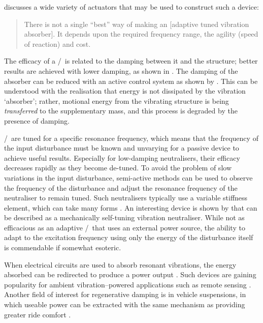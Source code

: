 \textcite{brennan2006} discusses a wide variety of actuators that may
be used to construct such a device:
\begin{quote}
  There is not a single ``best'' way of making an [adaptive tuned
  vibration absorber].
  It depends upon the required frequency range,
  the agility (speed of reaction) and cost.
\end{quote}

The efficacy of a \vibneut/\ is related to the damping between
it and the structure; better results are achieved with lower damping, as shown
in .
The damping of the absorber can be reduced with an
active control system as shown by \textcite{kidner1998}.
This can be
understood with the realisation that energy is not dissipated by the vibration
`absorber'; rather, motional energy from the vibrating structure is being
\emph{transferred} to the supplementary mass, and this process is degraded by
the presence of damping.

\Vibneut/\ are tuned for a specific resonance frequency, which means that the
frequency of the input disturbance must be known and unvarying for a passive
device to achieve useful results.
Especially for low-damping neutralisers,
their efficacy decreases rapidly as they become de-tuned.
To avoid the problem
of slow variations in the input disturbance, semi-active methods can be used
to observe the frequency of the disturbance and adjust the resonance frequency
of the neutraliser to remain tuned.
Such neutralisers typically use a variable
stiffness element, which can take many forms
\cite{ting-kong1999,kidner2002,holdhusen2007}.
An interesting device is shown
by \cite{ivers2008} that can be described as a mechanically self-tuning
vibration neutraliser.
While not as efficacious as an adaptive \vibneut/\ that
uses an external power source, the ability to adapt to the excitation
frequency using only the energy of the disturbance itself is commendable if
somewhat esoteric.

When electrical circuits are used to absorb resonant vibrations, the energy
absorbed can be redirected to produce a power output \cite{stephen2006}.
Such
devices are gaining popularity for ambient vibration--powered applications
such as remote sensing \cite{arnold2007}.
Another field of interest for
regenerative damping is in vehicle suspensions, in which useable power can be
extracted with the same mechanism as providing greater ride comfort
\cite{graves2000thesis}.

